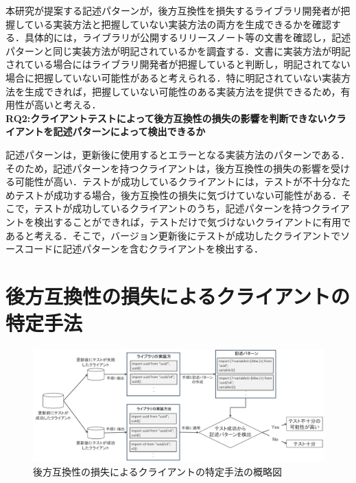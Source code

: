 \documentclass[11pt]{jreport}
\newcommand{\RQTwo}{クライアントテストによって後方互換性の損失の影響を判断できないクライアントを記述パターンによって検出できるか}
\begin{document}
本研究が提案する記述パターンが，後方互換性を損失するライブラリ開発者が把握している実装方法と把握していない実装方法の両方を生成できるかを確認する．具体的には，ライブラリが公開するリリースノート等の文書を確認し，記述パターンと同じ実装方法が明記されているかを調査する．文書に実装方法が明記されている場合にはライブラリ開発者が把握していると判断し，明記されてない場合に把握していない可能性があると考えられる．特に明記されていない実装方法を生成できれば，把握していない可能性のある実装方法を提供できるため，有用性が高いと考える．
\\
\noindent\textbf{RQ2:\RQTwo}

記述パターンは，更新後に使用するとエラーとなる実装方法のパターンである．そのため，記述パターンを持つクライアントは，後方互換性の損失の影響を受ける可能性が高い．テストが成功しているクライアントには，テストが不十分なためテストが成功する場合，後方互換性の損失に気づけていない可能性がある．そこで，テストが成功しているクライアントのうち，記述パターンを持つクライアントを検出することができれば，テストだけで気づけないクライアントに有用であると考える．そこで，バージョン更新後にテストが成功したクライアントでソースコードに記述パターンを含むクライアントを検出する．

\chapter{後方互換性の損失によるクライアントの特定手法}\label{sec:method}
\begin{figure}[ht]
\centerline{\includegraphics[width=1.0\linewidth]{BSthesis2024_Iida_fig/method.pdf}}
\caption{後方互換性の損失によるクライアントの特定手法の概略図}
\label{fig:method-overview}
\end{figure}
\end{document}
